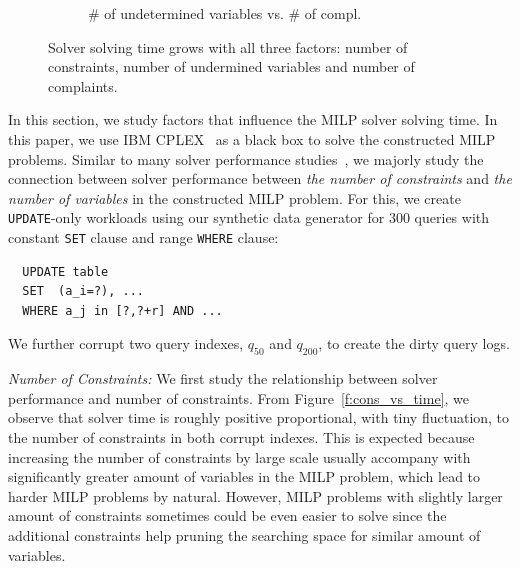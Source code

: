 \begin{figure}[t]
\begin{subfigure} [t]{.3\textwidth}
    \vspace*{-.25in}
    \caption{\# of undetermined variables vs. \# of compl.}
    \vspace*{-.1in}
    \label{f:compl_vs_time}
    \end{subfigure}
    \fi
   \caption{Solver solving time grows with all three factors: number of constraints, number of undermined variables and number of complaints. }
   \vspace*{-.1in}
   \label{f:soltime}
  \end{figure}
\fi
{}
In this section, we study factors that influence the MILP solver solving time. In this paper, we
use IBM CPLEX~\cite{cplex2014v12} as a black box to solve the constructed MILP problems.   Similar to many solver performance studies~\cite{atamturk2005integer, meindl2012analysis, gearhart2013comparison}, 
we majorly study the connection between solver performance between \textit{the number of constraints} and \textit{the number of variables} in the constructed MILP problem. For this, we create \texttt{UPDATE}-only workloads using our synthetic data generator for 300 queries with constant \texttt{SET} clause and range \texttt{WHERE} clause: 

{\scriptsize
\begin{verbatim}
  UPDATE table
  SET  (a_i=?), ...
  WHERE a_j in [?,?+r] AND ...
\end{verbatim}
}
We further corrupt two query indexes, $q_{50}$ and $q_{200}$, to create the dirty query logs.    


\smallskip
\emph{Number of Constraints: } We first study the relationship between solver performance and number of constraints.   From Figure~\ref{f:cons_vs_time}, we observe that solver time is roughly positive proportional, with tiny fluctuation, to the number of constraints in both corrupt indexes. This is expected because increasing the number of constraints by large scale usually accompany with significantly greater amount of variables in the MILP problem, which lead to harder MILP problems by natural. However, MILP problems  with slightly larger amount of constraints sometimes could be even easier to solve since the additional constraints help pruning the searching space for similar amount of variables.

